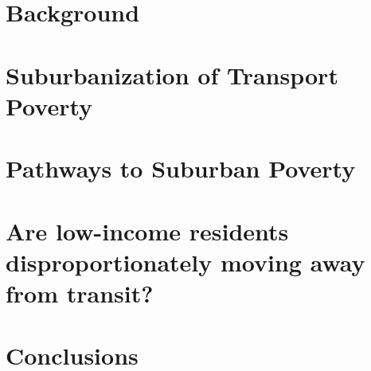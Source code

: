 \documentclass[11 pt, letterpaper]{report}
\begin{document}
\chapter{Background}
\label{ch:background}




\chapter{Suburbanization of Transport Poverty}
\label{ch:subtrapov}




\chapter{Pathways to Suburban Poverty}
\label{ch:pathsubpov}




\chapter{Are low-income residents disproportionately moving away from transit?}
\label{ch:lowinctra}





\chapter{Conclusions}
\label{ch:conc}








\end{document}
